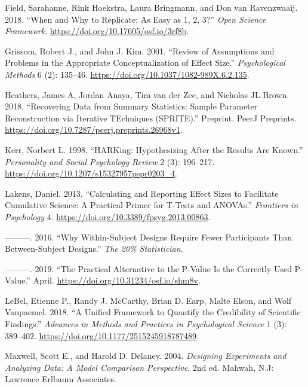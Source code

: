 \documentclass[]{article}
\begin{document}
\leavevmode\hypertarget{ref-Field2018}{}%
Field, Sarahanne, Rink Hoekstra, Laura Bringmann, and Don van
Ravenzwaaij. 2018. ``When and Why to Replicate: As Easy as 1, 2, 3?''
\emph{Open Science Framework}.
\url{https://doi.org/10.17605/osf.io/3rf8b}.

\leavevmode\hypertarget{ref-Grissom2001}{}%
Grissom, Robert J., and John J. Kim. 2001. ``Review of Assumptions and
Problems in the Appropriate Conceptualization of Effect Size.''
\emph{Psychological Methods} 6 (2): 135--46.
\url{https://doi.org/10.1037/1082-989X.6.2.135}.

\leavevmode\hypertarget{ref-Heathers2018}{}%
Heathers, James A, Jordan Anaya, Tim van der Zee, and Nicholas JL Brown.
2018. ``Recovering Data from Summary Statistics: Sample Parameter
Reconstruction via Iterative TEchniques (SPRITE).'' Preprint. PeerJ
Preprints. \url{https://doi.org/10.7287/peerj.preprints.26968v1}.

\leavevmode\hypertarget{ref-Kerr1998}{}%
Kerr, Norbert L. 1998. ``HARKing: Hypothesizing After the Results Are
Known.'' \emph{Personality and Social Psychology Review} 2 (3):
196--217. \url{https://doi.org/10.1207/s15327957pspr0203_4}.

\leavevmode\hypertarget{ref-Lakens2013}{}%
Lakens, Daniel. 2013. ``Calculating and Reporting Effect Sizes to
Facilitate Cumulative Science: A Practical Primer for T-Tests and
ANOVAs.'' \emph{Frontiers in Psychology} 4.
\url{https://doi.org/10.3389/fpsyg.2013.00863}.

\leavevmode\hypertarget{ref-Lakens2016}{}%
---------. 2016. ``Why Within-Subject Designs Require Fewer Participants
Than Between-Subject Designs.'' \emph{The 20\% Statistician}.

\leavevmode\hypertarget{ref-Lakens2019b}{}%
---------. 2019. ``The Practical Alternative to the P-Value Is the
Correctly Used P-Value.'' April.
\url{https://doi.org/10.31234/osf.io/shm8v}.

\leavevmode\hypertarget{ref-LeBel2018}{}%
LeBel, Etienne P., Randy J. McCarthy, Brian D. Earp, Malte Elson, and
Wolf Vanpaemel. 2018. ``A Unified Framework to Quantify the Credibility
of Scientific Findings.'' \emph{Advances in Methods and Practices in
Psychological Science} 1 (3): 389--402.
\url{https://doi.org/10.1177/2515245918787489}.

\leavevmode\hypertarget{ref-Maxwell2004}{}%
Maxwell, Scott E., and Harold D. Delaney. 2004. \emph{Designing
Experiments and Analyzing Data: A Model Comparison Perspective}. 2nd ed.
Mahwah, N.J: Lawrence Erlbaum Associates.
\end{document}
